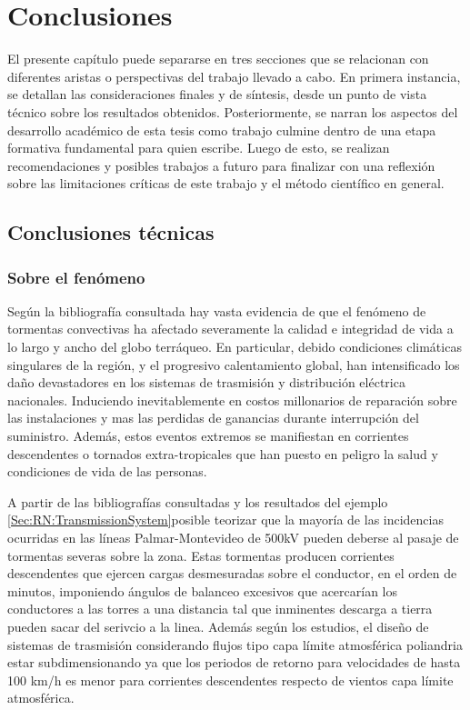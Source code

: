 \chapter{Conclusiones}\label{Cap:Conlcusiones}
\linenumbers

El presente capítulo puede separarse en tres secciones que se relacionan con diferentes aristas o perspectivas del trabajo llevado a cabo. En primera instancia, se detallan las consideraciones finales y de síntesis, desde un punto de vista técnico sobre los resultados obtenidos. Posteriormente, se narran los aspectos del desarrollo académico de esta tesis como trabajo culmine dentro de una etapa formativa fundamental para quien escribe. Luego de esto, se realizan recomendaciones y posibles trabajos a futuro para finalizar con una reflexión sobre las limitaciones críticas de este trabajo y el método científico en general. 

\section{Conclusiones técnicas}

\subsection{Sobre el fenómeno}
Según la bibliografía consultada hay vasta evidencia de que el fenómeno de tormentas convectivas ha afectado severamente la calidad e integridad de vida a lo largo y ancho del globo terráqueo. En particular, debido condiciones climáticas singulares de la región, y el progresivo calentamiento global, han intensificado los daño devastadores en los sistemas de trasmisión y distribución eléctrica nacionales. Induciendo inevitablemente en costos millonarios de reparación sobre las instalaciones y mas las perdidas de ganancias durante interrupción del suministro. Además, estos eventos extremos se manifiestan en corrientes descendentes o tornados extra-tropicales que han puesto en peligro la salud y condiciones de vida de las personas. 

A partir de las bibliografías consultadas y los resultados del  ejemplo \ref{Sec:RN:TransmissionSystem}posible teorizar que la mayoría de las incidencias ocurridas en las líneas Palmar-Montevideo de 500kV pueden deberse al pasaje de tormentas severas sobre la zona. Estas tormentas producen corrientes descendentes que ejercen cargas desmesuradas sobre el conductor, en el orden de minutos, imponiendo ángulos de balanceo excesivos que acercarían los conductores a las torres a una distancia tal que inminentes descarga a tierra pueden sacar del serivcio a la linea. Además según los estudios, el diseño de sistemas de trasmisión considerando flujos tipo capa límite atmosférica poliandria estar subdimensionando ya que los periodos de retorno para velocidades de hasta 100 km/h es menor para corrientes descendentes respecto de vientos capa límite atmosférica. 


